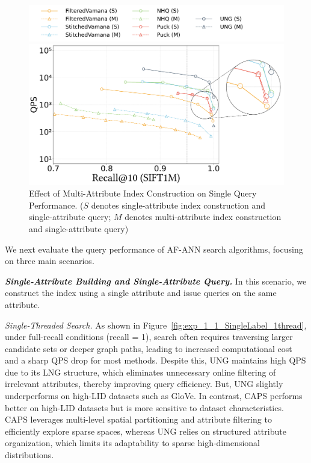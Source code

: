 \documentclass[sigconf, nonacm]{acmart}
\begin{document}
\begin{sloppypar}

\begin{figure}
    \centering
    \setlength{\abovecaptionskip}{0cm}
    \setlength{\belowcaptionskip}{-0.1cm}
    \hspace*{15pt} %
    \includegraphics[width=0.98\columnwidth]{figures/exp/exp_2_legend.pdf} %
    \vspace{-10pt} %
    
    \includegraphics[width=0.9\columnwidth]{figures/exp/exp_2_1.pdf}
    \caption{Effect of Multi-Attribute Index Construction on Single Query Performance. ($S$ denotes single-attribute index construction and single-attribute query; $M$ denotes multi-attribute index construction and single-attribute query)}
    \label{fig:exp_2_1}
    
\end{figure}


We next evaluate the query performance of AF-ANN search algorithms, focusing on three main scenarios.

\textit{\textbf{Single-Attribute Building and Single-Attribute Query.}}
In this scenario, we construct the index using a single attribute and issue queries on the same attribute.

\textit{Single-Threaded Search.}  
As shown in Figure~\ref{fig:exp_1_1_SingleLabel_1thread}, under full-recall conditions (recall = 1), search often requires traversing larger candidate sets or deeper graph paths, leading to increased computational cost and a sharp QPS drop for most methods. Despite this, UNG maintains high QPS due to its LNG structure, which eliminates unnecessary online filtering of irrelevant attributes, thereby improving query efficiency. But, UNG slightly underperforms on high-LID datasets such as GloVe. In contrast, CAPS performs better on high-LID datasets but is more sensitive to dataset characteristics. CAPS leverages multi-level spatial partitioning and attribute filtering to efficiently explore sparse spaces, whereas UNG relies on structured attribute organization, which limits its adaptability to sparse high-dimensional distributions.


\end{sloppypar}
\end{document}
